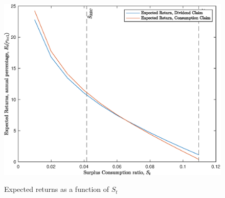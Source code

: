 \begin{figure}[H]
    \centering
    \caption{Expected returns as a function of $S_t$}
    \includegraphics{Figures/ErPCPD.eps}
    \label{fig:ErPCPD}
\end{figure}

